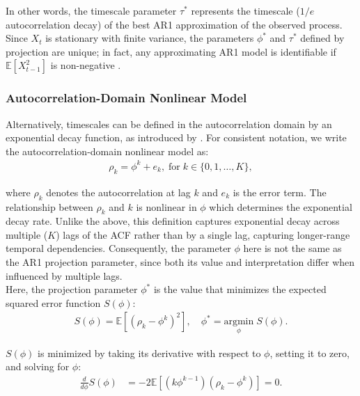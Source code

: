 \documentclass[docs/main.tex]{subfiles}
\begin{document}
\noindent In other words, the timescale parameter $\tau^*$ represents the timescale ($1/e$ autocorrelation decay) of the best AR1 approximation of the observed process. Since $X_t$ is stationary with finite variance, the parameters $\phi^*$ and $\tau^*$ defined by projection are unique; in fact, any approximating AR1 model is identifiable if $\mathbb{E}[X_{t-1}^2]$ is non-negative \citep[Theorem~14.28]{hansen_econometrics_2022}.

\subsubsection{Autocorrelation-Domain Nonlinear Model}\label{sec:autocorrelation-domain-nonlinear-model}

Alternatively, timescales can be defined in the autocorrelation domain by an exponential decay function, as introduced by \citet{murray_hierarchy_2014}. For consistent notation, we write the autocorrelation-domain nonlinear model as:
\begin{align}\label{eq:nlm}
    \rho_k = \phi^k + e_k, \; \text{for}\; k \in \{0, 1, \ldots, K\},
\end{align}

\noindent where $\rho_k$ denotes the autocorrelation at lag $k$ and $e_k$ is the error term. The relationship between $\rho_k$ and $k$ is nonlinear in $\phi$ which determines the exponential decay rate. Unlike the  above, this definition captures exponential decay across multiple ($K$) lags of the ACF rather than by a single lag, capturing longer-range temporal dependencies. Consequently, the parameter $\phi$ here is not the same as the AR1 projection parameter, since both its value and interpretation differ when influenced by multiple lags.\\

Here, the projection parameter $\phi^*$ is the value that minimizes the expected squared error function $S(\phi)$:
\begin{align}\label{eq:nlm_loss}
    S(\phi) = \mathbb{E}[(\rho_k - \phi^k)^2], \quad \phi^* = \underset{\phi}{\text{argmin}} \; S(\phi).
\end{align}

\noindent $S(\phi)$ is minimized by taking its derivative with respect to $\phi$, setting it to zero, and solving for $\phi$:
\begin{align}
    \frac{d}{d\phi} S(\phi) &= -2\mathbb{E}[(k\phi^{k-1})(\rho_k - \phi^k)] = 0.
\end{align}
\end{document}
